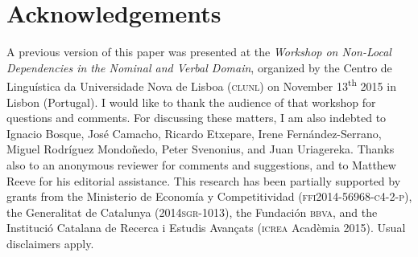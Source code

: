 \documentclass[output=paper]{langsci/langscibook}
\begin{document}
\section*{Acknowledgements}
A previous version of this paper was presented at the \textit{Workshop on Non-Local Dependencies in the Nominal and Verbal Domain}, organized by the Centro de Linguística da Universidade Nova de Lisboa (\textsc{clunl}) on November 13\textsuperscript{th} 2015 in Lisbon (Portugal). I would like to thank the audience of that workshop for questions and comments. For discussing these matters, I am also indebted to Ignacio Bosque, José Camacho, Ricardo Etxepare, Irene Fernández-Serrano, Miguel Rodríguez Mondoñedo, Peter Svenonius, and Juan Uriagereka. Thanks also to an anonymous reviewer for comments and suggestions, and to Matthew Reeve for his editorial assistance. This research has been partially supported by grants from the Ministerio de Economía y Competitividad (\textsc{ffi2014-56968-c4-2-p}), the Generalitat de Catalunya (\textsc{2014sgr-1013}), the Fundación \textsc{bbva}, and the Institució Catalana de Recerca i Estudis Avançats (\textsc{icrea} Acadèmia 2015). Usual disclaimers apply.
\end{document}
